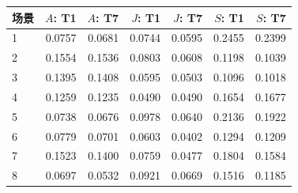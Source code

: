 \begin{inlinetable}
\centering
\caption{105,000 次适配迭代后的逐场景指标（DN），每个场景由两条偏移轨迹的测量值取平均。}\label{tab:sources}
\footnotesize
\setlength{\tabcolsep}{3pt}
\begin{tabular}{lrrrrrr}
\toprule
场景 & $A$: T1 & $A$: T7 & $J$: T1 & $J$: T7 & $S$: T1 & $S$: T7 \\
\midrule
1 & 0.0757 & 0.0681 & 0.0744 & 0.0595 & 0.2455 & 0.2399 \\
2 & 0.1554 & 0.1536 & 0.0803 & 0.0608 & 0.1198 & 0.1039 \\
3 & 0.1395 & 0.1408 & 0.0595 & 0.0503 & 0.1096 & 0.1018 \\
4 & 0.1259 & 0.1235 & 0.0490 & 0.0490 & 0.1654 & 0.1677 \\
5 & 0.0738 & 0.0676 & 0.0978 & 0.0640 & 0.2136 & 0.1922 \\
6 & 0.0779 & 0.0701 & 0.0603 & 0.0402 & 0.1294 & 0.1209 \\
7 & 0.1523 & 0.1400 & 0.0759 & 0.0477 & 0.1804 & 0.1584 \\
8 & 0.0697 & 0.0532 & 0.0921 & 0.0669 & 0.1516 & 0.1185 \\
\bottomrule
\end{tabular}
\end{inlinetable}
